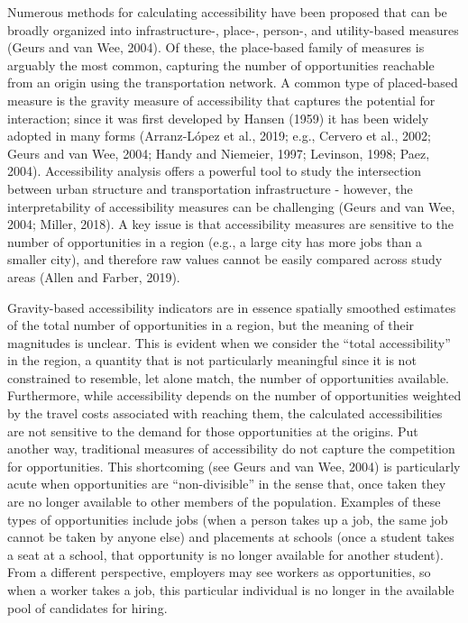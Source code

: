 \documentclass[]{elsarticle} %
\begin{document}
Numerous methods for calculating accessibility have been proposed that
can be broadly organized into infrastructure-, place-, person-, and
utility-based measures (Geurs and van Wee, 2004). Of these, the
place-based family of measures is arguably the most common, capturing
the number of opportunities reachable from an origin using the
transportation network. A common type of placed-based measure is the
gravity measure of accessibility that captures the potential for
interaction; since it was first developed by Hansen (1959) it has been
widely adopted in many forms (Arranz-López et al., 2019; e.g., Cervero
et al., 2002; Geurs and van Wee, 2004; Handy and Niemeier, 1997;
Levinson, 1998; Paez, 2004). Accessibility analysis offers a powerful
tool to study the intersection between urban structure and
transportation infrastructure - however, the interpretability of
accessibility measures can be challenging (Geurs and van Wee, 2004;
Miller, 2018). A key issue is that accessibility measures are sensitive
to the number of opportunities in a region (e.g., a large city has more
jobs than a smaller city), and therefore raw values cannot be easily
compared across study areas (Allen and Farber, 2019).

Gravity-based accessibility indicators are in essence spatially smoothed
estimates of the total number of opportunities in a region, but the
meaning of their magnitudes is unclear. This is evident when we consider
the ``total accessibility'' in the region, a quantity that is not
particularly meaningful since it is not constrained to resemble, let
alone match, the number of opportunities available. Furthermore, while
accessibility depends on the number of opportunities weighted by the
travel costs associated with reaching them, the calculated
accessibilities are not sensitive to the demand for those opportunities
at the origins. Put another way, traditional measures of accessibility
do not capture the competition for opportunities. This shortcoming (see
Geurs and van Wee, 2004) is particularly acute when opportunities are
``non-divisible'' in the sense that, once taken they are no longer
available to other members of the population. Examples of these types of
opportunities include jobs (when a person takes up a job, the same job
cannot be taken by anyone else) and placements at schools (once a
student takes a seat at a school, that opportunity is no longer
available for another student). From a different perspective, employers
may see workers as opportunities, so when a worker takes a job, this
particular individual is no longer in the available pool of candidates
for hiring.
\end{document}
